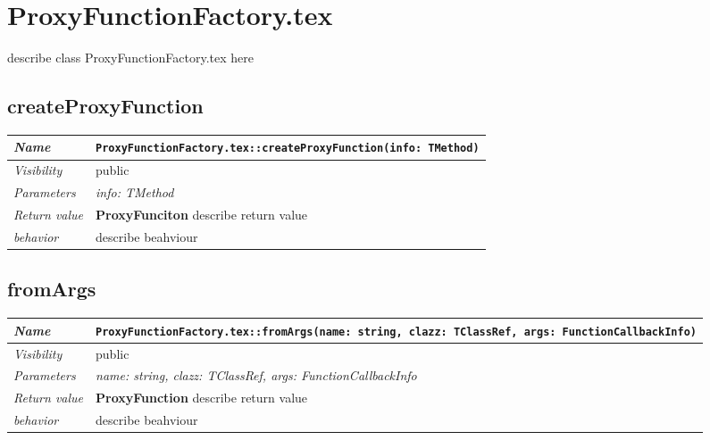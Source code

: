 \chapter{ProxyFunctionFactory.tex}
describe class ProxyFunctionFactory.tex here
\section{createProxyFunction}
\begin{longtable}{p{3cm} @{\hskip 1cm} p{12cm}}
 \hline
\textit{Name} & \texttt{ProxyFunctionFactory.tex::createProxyFunction(info: TMethod)}\\
\hline
 \textit{Visibility} & public\\
\hline
\textit{Parameters} & \textit{info: TMethod}\\
\hline
\textit{Return value} & \textbf{ ProxyFunciton} describe return value\\
  \hline
 \textit{behavior} & describe beahviour \\
\hline
\end{longtable} \pagebreak
 \section{fromArgs}
\begin{longtable}{p{3cm} @{\hskip 1cm} p{12cm}}
 \hline
\textit{Name} & \texttt{ProxyFunctionFactory.tex::fromArgs(name: string, clazz: TClassRef, args: FunctionCallbackInfo)}\\
\hline
 \textit{Visibility} & public\\
\hline
\textit{Parameters} & \textit{name: string, clazz: TClassRef, args: FunctionCallbackInfo}\\
\hline
\textit{Return value} & \textbf{ ProxyFunction} describe return value\\
  \hline
 \textit{behavior} & describe beahviour \\
\hline
\end{longtable} \pagebreak
 